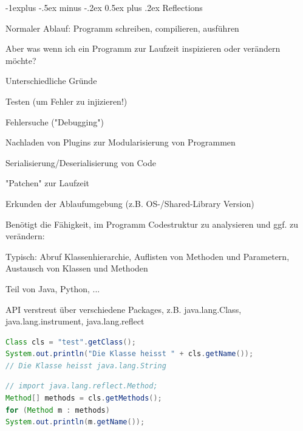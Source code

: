\documentclass[10pt]{article}
\makeatletter
\renewcommand{\subsection}{\@startsection{subsection}{2}{0mm}%
                                {-1explus -.5ex minus -.2ex}%
                                {0.5ex plus .2ex}%
                                {\normalfont\normalsize\bfseries}}
\makeatother
\begin{document}
\subsection{Reflections}
\begin{itemize*}
  \item Normaler Ablauf: Programm schreiben, compilieren, ausführen
  \begin{itemize*}
    \item Aber was wenn ich ein Programm zur Laufzeit inspizieren oder verändern möchte?
  \end{itemize*}
  \item Unterschiedliche Gründe
  \begin{itemize*}
    \item Testen (um Fehler zu injizieren!)
    \item Fehlersuche ("Debugging")
    \item Nachladen von Plugins zur Modularisierung von Programmen
    \item Serialisierung/Deserialisierung von Code
    \item "Patchen" zur Laufzeit
    \item Erkunden der Ablaufumgebung (z.B. OS-/Shared-Library Version)
  \end{itemize*}
  \item Benötigt die Fähigkeit, im Programm Codestruktur zu analysieren und ggf. zu verändern:
  \begin{itemize*}
    \item Typisch: Abruf Klassenhierarchie, Auflisten von Methoden und Parametern, Austausch von Klassen und Methoden
    \item Teil von Java, Python, ...
  \end{itemize*}
\end{itemize*}

API verstreut über verschiedene Packages, z.B. java.lang.Class, java.lang.instrument, java.lang.reflect

\begin{lstlisting}[language=java]
Class cls = "test".getClass();
System.out.println("Die Klasse heisst " + cls.getName());
// Die Klasse heisst java.lang.String
\end{lstlisting}

\begin{lstlisting}[language=java]
// import java.lang.reflect.Method;
Method[] methods = cls.getMethods();
for (Method m : methods)
System.out.println(m.getName());
\end{lstlisting}
\end{document}
